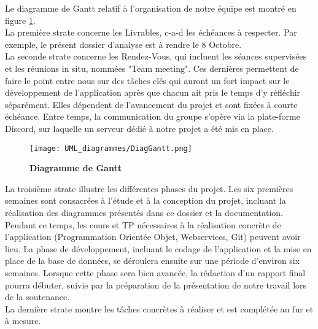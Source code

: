 \documentclass[11pt]{article}
\begin{document}
\bigbreak

Le diagramme de Gantt relatif à l'organisation de notre équipe est montré en figure \ref{UML_gantt}.\\

La première strate concerne les Livrables, c-a-d les échéances à respecter. Par exemple, le présent dossier d'analyse est à rendre le 8 Octobre.\\

La seconde strate concerne les Rendez-Vous, qui incluent les séances supervisées et les réunions in situ, nommées "Team meeting". Ces dernières permettent de faire le point entre nous sur des tâches clés qui auront un fort impact sur le développement de l'application après que chacun ait pris le temps d'y réfléchir séparément. Elles dépendent de l'avancement du projet et sont fixées à courte échéance. Entre temps, la communication du groupe s'opère via la plate-forme Discord, sur laquelle un serveur dédié à notre projet a été mis en place.\\

\begin{figure}[H]
    \caption{\textbf{Diagramme de Gantt}}
    \label{UML_gantt}
    \centering
    \texttt{[image: UML\_diagrammes/DiagGantt.png]}
\end{figure}

La troisième strate illustre les différentes phases du projet. Les six premières semaines sont consacrées à l'étude et à la conception du projet, incluant la réalisation des diagrammes présentés dans ce dossier et la documentation. Pendant ce temps, les cours et TP nécessaires à la réalisation concrète de l'application (Programmation Orientée Objet, Webservices, Git) peuvent avoir lieu. La phase de développement, incluant le codage de l'application et la mise en place de la base de données, se déroulera ensuite sur une période d'environ six semaines. Lorsque cette phase sera bien avancée, la rédaction d'un rapport final pourra débuter, suivie par la préparation de la présentation de notre travail lors de la soutenance.\\

La dernière strate montre les tâches concrètes à réaliser et est complétée au fur et à mesure.\\





\end{document}
